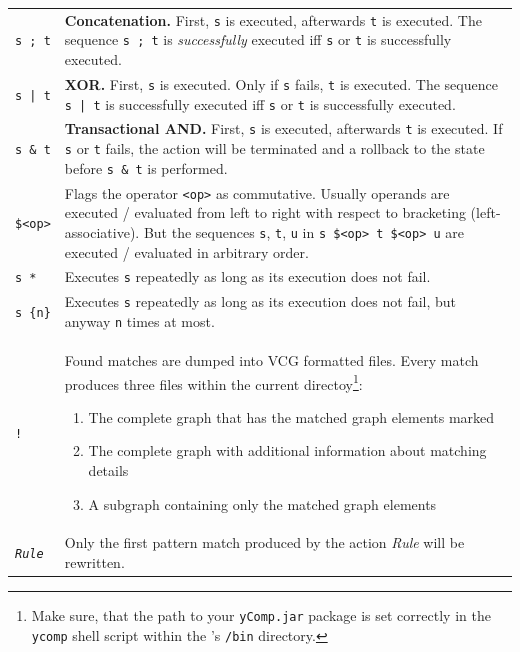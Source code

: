\begin{table}[htbp]
\begin{minipage}{\linewidth} \renewcommand{\footnoterule}{} 
\begin{tabularx}{\linewidth}{|lX|}
\hline
\texttt{s ; t}		& \textbf{Concatenation.} First, \texttt{s} is executed, afterwards \texttt{t} is executed. The sequence \texttt{s ; t} is \emph{successfully} executed iff \texttt{s} or \texttt{t} is successfully executed.\\
\texttt{s | t}		& \textbf{XOR.} First, \texttt{s} is executed. Only if \texttt{s} fails, \texttt{t} is executed. The sequence \texttt{s | t} is successfully executed iff \texttt{s} or \texttt{t} is successfully executed.\\
\texttt{s \& t}	& \textbf{Transactional AND.} First, \texttt{s} is executed, afterwards \texttt{t} is executed. If \texttt{s} or \texttt{t} fails, the action will be terminated and a rollback to the state before \texttt{s \& t} is performed.\\
\texttt{\$<op>}	& Flags the operator \texttt{<op>} as commutative. Usually operands are executed / evaluated from left to right with respect to bracketing (left-associative). But the sequences \texttt{s}, \texttt{t}, \texttt{u} in \texttt{s \$<op> t \$<op> u} are executed / evaluated in arbitrary order. \\
\texttt{s *}		& Executes \texttt{s} repeatedly as long as its execution does not fail.\\
\texttt{s \{n\}}	& Executes \texttt{s} repeatedly as long as its execution does not fail, but anyway \texttt{n} times at most.\\
\texttt{!}		& Found matches are dumped into VCG formatted files. Every match produces three files within the current directoy\footnote{Make sure, that the path to your \texttt{yComp.jar} package is set correctly in the \texttt{ycomp} shell script within the \GrG's \texttt{/bin} directory.}:
\begin{enumerate}
  \item The complete graph that has the matched graph elements marked
  \item The complete graph with additional information about matching details
  \item A subgraph containing only the matched graph elements
\end{enumerate}\\
\texttt{\emph{Rule}} & Only the first pattern match produced by the action \emph{Rule} will be rewritten.\\

\end{tabularx}
\end{minipage}
\end{table}
